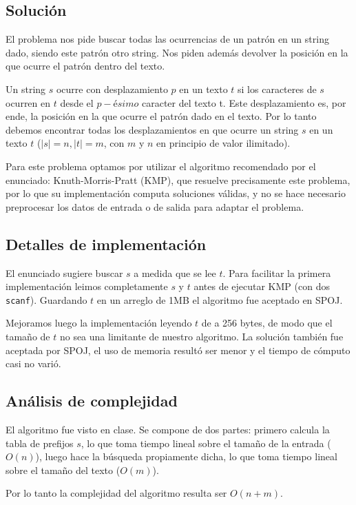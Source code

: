 \subsection*{Solución}
El problema nos pide buscar todas las ocurrencias de un patrón en un string dado,
siendo este patrón otro string. Nos piden además devolver la posición en la que
ocurre el patrón dentro del texto.

Un string $s$ ocurre con desplazamiento $p$ en un texto $t$ si los caracteres
de $s$ ocurren en $t$ desde el $p-ésimo$ caracter del texto t. Este desplazamiento
es, por ende, la posición en la que ocurre el patrón dado en el texto. Por lo tanto
debemos encontrar todas los desplazamientos en que ocurre un string $s$ en un texto
$t$ ($|s|=n, |t|=m$, con $m$ y $n$ en principio de valor ilimitado).

Para este problema optamos por utilizar el algoritmo recomendado por el
enunciado: Knuth-Morris-Pratt (KMP), que resuelve precisamente
este problema, por lo que su implementación computa soluciones válidas,
y no se hace necesario preprocesar los datos de entrada o de salida para
adaptar el problema.

\subsection*{Detalles de implementación}

El enunciado sugiere buscar $s$ a medida que se lee $t$. Para facilitar la
primera implementación leimos completamente $s$ y $t$ antes de ejecutar KMP
(con dos {\tt scanf}). Guardando $t$ en un arreglo de 1MB el algoritmo fue
aceptado en SPOJ.

Mejoramos luego la implementación leyendo $t$ de a 256 bytes, de modo que
el tamaño de $t$ no sea una limitante de nuestro algoritmo. La solución
también fue aceptada por SPOJ, el uso de memoria resultó ser menor y el
tiempo de cómputo casi no varió.

\subsection*{Análisis de complejidad}

El algoritmo fue visto en clase. Se compone de dos partes: primero calcula la tabla de prefijos
$s$, lo que toma tiempo lineal sobre el tamaño de la entrada ($O(n)$), luego hace la
búsqueda propiamente dicha, lo que toma tiempo lineal sobre el tamaño del texto ($O(m)$).

Por lo tanto la complejidad del algoritmo resulta ser $O(n + m)$.